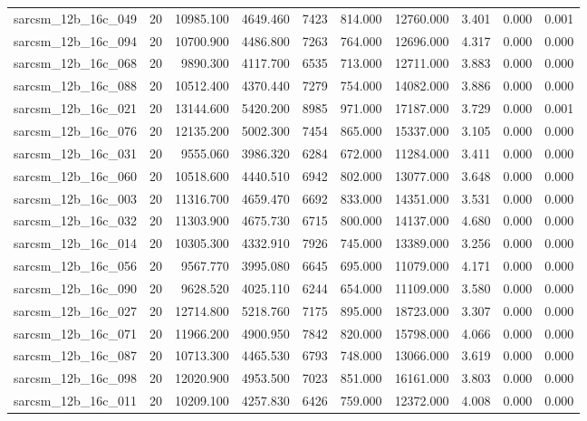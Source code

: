 \begin{tabular}{lrrrrrrrrr}
sarcsm\_12b\_16c\_049 & 20 & 10985.100 & 4649.460 & 7423 & 814.000 & 12760.000 & 3.401 & 0.000 & 0.001 \\
sarcsm\_12b\_16c\_094 & 20 & 10700.900 & 4486.800 & 7263 & 764.000 & 12696.000 & 4.317 & 0.000 & 0.000 \\
sarcsm\_12b\_16c\_068 & 20 & 9890.300 & 4117.700 & 6535 & 713.000 & 12711.000 & 3.883 & 0.000 & 0.000 \\
sarcsm\_12b\_16c\_088 & 20 & 10512.400 & 4370.440 & 7279 & 754.000 & 14082.000 & 3.886 & 0.000 & 0.000 \\
sarcsm\_12b\_16c\_021 & 20 & 13144.600 & 5420.200 & 8985 & 971.000 & 17187.000 & 3.729 & 0.000 & 0.001 \\
sarcsm\_12b\_16c\_076 & 20 & 12135.200 & 5002.300 & 7454 & 865.000 & 15337.000 & 3.105 & 0.000 & 0.000 \\
sarcsm\_12b\_16c\_031 & 20 & 9555.060 & 3986.320 & 6284 & 672.000 & 11284.000 & 3.411 & 0.000 & 0.000 \\
sarcsm\_12b\_16c\_060 & 20 & 10518.600 & 4440.510 & 6942 & 802.000 & 13077.000 & 3.648 & 0.000 & 0.000 \\
sarcsm\_12b\_16c\_003 & 20 & 11316.700 & 4659.470 & 6692 & 833.000 & 14351.000 & 3.531 & 0.000 & 0.000 \\
sarcsm\_12b\_16c\_032 & 20 & 11303.900 & 4675.730 & 6715 & 800.000 & 14137.000 & 4.680 & 0.000 & 0.000 \\
sarcsm\_12b\_16c\_014 & 20 & 10305.300 & 4332.910 & 7926 & 745.000 & 13389.000 & 3.256 & 0.000 & 0.000 \\
sarcsm\_12b\_16c\_056 & 20 & 9567.770 & 3995.080 & 6645 & 695.000 & 11079.000 & 4.171 & 0.000 & 0.000 \\
sarcsm\_12b\_16c\_090 & 20 & 9628.520 & 4025.110 & 6244 & 654.000 & 11109.000 & 3.580 & 0.000 & 0.000 \\
sarcsm\_12b\_16c\_027 & 20 & 12714.800 & 5218.760 & 7175 & 895.000 & 18723.000 & 3.307 & 0.000 & 0.000 \\
sarcsm\_12b\_16c\_071 & 20 & 11966.200 & 4900.950 & 7842 & 820.000 & 15798.000 & 4.066 & 0.000 & 0.000 \\
sarcsm\_12b\_16c\_087 & 20 & 10713.300 & 4465.530 & 6793 & 748.000 & 13066.000 & 3.619 & 0.000 & 0.000 \\
sarcsm\_12b\_16c\_098 & 20 & 12020.900 & 4953.500 & 7023 & 851.000 & 16161.000 & 3.803 & 0.000 & 0.000 \\
sarcsm\_12b\_16c\_011 & 20 & 10209.100 & 4257.830 & 6426 & 759.000 & 12372.000 & 4.008 & 0.000 & 0.000 \\

\end{tabular}

